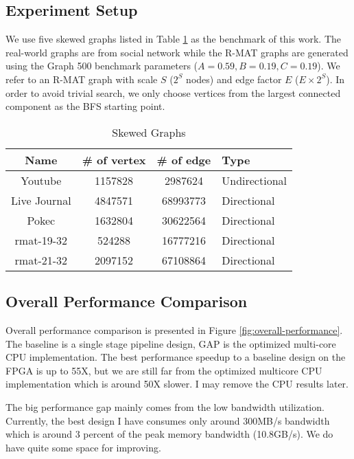 \subsection{Experiment Setup}
We use five skewed graphs listed in Table \ref{tab:graph} as the benchmark of this work. 
The real-world graphs are from social network \cite{yang2012defining, 
leskovec2009community, takac2012data} while the R-MAT graphs are generated 
using the Graph 500 benchmark parameters ($A=0.59, B=0.19, C=0.19$). We refer 
to an R-MAT graph with scale $S$ ($2^{S}$ nodes) and edge factor $E$ ($E\times 2^{S}$). 
In order to avoid trivial search, we only choose vertices from the largest 
connected component as the BFS starting point.

\begin{table}
  \caption{Skewed Graphs}
  \label{tab:graph}
  \begin{tabular}{cccl}
    \toprule
      Name & \# of vertex & \# of edge & Type \\
    \midrule
      Youtube \cite{yang2012defining} & 1157828 & 2987624 & Undirectional \\
      Live Journal \cite{leskovec2009community} & 4847571 & 68993773 & Directional \\
      Pokec \cite{takac2012data} & 1632804 & 30622564 & Directional \\
      rmat-19-32 & 524288 & 16777216 & Directional \\
      rmat-21-32 & 2097152 & 67108864 & Directional \\
  \bottomrule
\end{tabular}
\end{table}


\subsection{Overall Performance Comparison}
Overall performance comparison is presented in Figure \ref{fig:overall-performance}. 
The baseline is a single stage pipeline design, GAP is the optimized 
multi-core CPU implementation. The best performance speedup to a baseline design 
on the FPGA is up to 55X, but we are still far from the optimized multicore 
CPU implementation which is around 50X slower. I may remove the CPU results later. 

The big performance gap mainly comes from the low bandwidth utilization.
Currently, the best design I have consumes only around 300MB/s bandwidth 
which is around 3 percent of the peak memory bandwidth (10.8GB/s). We do have 
quite some space for improving.

